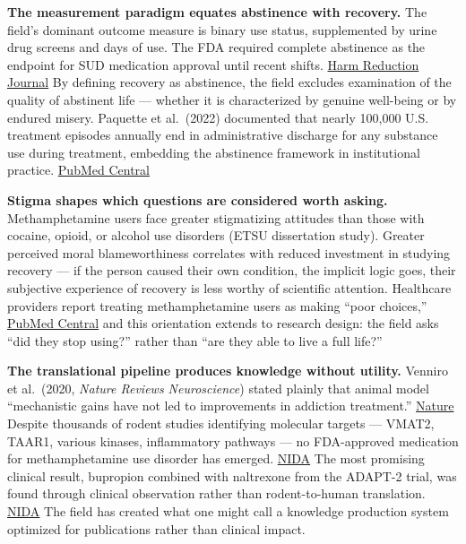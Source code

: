 \textbf{The measurement paradigm equates abstinence with recovery.} The field's dominant outcome measure is binary use status, supplemented by urine drug screens and days of use. The FDA required complete abstinence as the endpoint for SUD medication approval until recent shifts. \href{https://harmreductionjournal.biomedcentral.com/articles/10.1186/s12954-025-01155-6}{Harm Reduction Journal} By defining recovery as abstinence, the field excludes examination of the quality of abstinent life --- whether it is characterized by genuine well-being or by endured misery. Paquette et al.~(2022) documented that nearly 100,000 U.S. treatment episodes annually end in administrative discharge for any substance use during treatment, embedding the abstinence framework in institutional practice. \href{https://pmc.ncbi.nlm.nih.gov/articles/PMC8815796/}{PubMed Central}

\textbf{Stigma shapes which questions are considered worth asking.} Methamphetamine users face greater stigmatizing attitudes than those with cocaine, opioid, or alcohol use disorders (ETSU dissertation study). Greater perceived moral blameworthiness correlates with reduced investment in studying recovery --- if the person caused their own condition, the implicit logic goes, their subjective experience of recovery is less worthy of scientific attention. Healthcare providers report treating methamphetamine users as making ``poor choices,'' \href{https://pmc.ncbi.nlm.nih.gov/articles/PMC10896942/}{PubMed Central} and this orientation extends to research design: the field asks ``did they stop using?'' rather than ``are they able to live a full life?''

\textbf{The translational pipeline produces knowledge without utility.} Venniro et al.~(2020, \emph{Nature Reviews Neuroscience}) stated plainly that animal model ``mechanistic gains have not led to improvements in addiction treatment.'' \href{https://www.nature.com/articles/s41583-020-0378-z}{Nature} Despite thousands of rodent studies identifying molecular targets --- VMAT2, TAAR1, various kinases, inflammatory pathways --- no FDA-approved medication for methamphetamine use disorder has emerged. \href{https://nida.nih.gov/about-nida/legislative-activities/budget-information/fiscal-year-2022-budget-information-congressional-justification-national-institute-drug-abuse}{NIDA} The most promising clinical result, bupropion combined with naltrexone from the ADAPT-2 trial, was found through clinical observation rather than rodent-to-human translation. \href{https://nida.nih.gov/about-nida/legislative-activities/budget-information/fiscal-year-2022-budget-information-congressional-justification-national-institute-drug-abuse}{NIDA} The field has created what one might call a knowledge production system optimized for publications rather than clinical impact.

